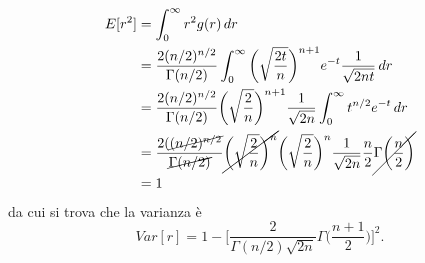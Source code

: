 \documentclass{article}
\theoremstyle{remark}
\begin{document}
\begin{equation}
    \begin{split}
        E[r^2] &= \int_0^\infty r^2g(r)\,dr \\
        &= \frac{2(n/2)^{n/2}}{\Gamma(n/2)}\int_0^\infty \bigg(\sqrt{\frac{2t}{n}}\bigg)^{n + 1}e^{-t}\frac{1}{\sqrt{2nt}}\,dr \\
        &= \frac{2(n/2)^{n/2}}{\Gamma(n/2)}\bigg(\sqrt{\frac{2}{n}}\bigg)^{n + 1}\frac{1}{\sqrt{2n}}\int_0^\infty t^{n/2}e^{-t}\,dr \\
        &= \frac{2(\cancel{(n/2)^{n/2}}}{\cancel{\Gamma(n/2)}}\cancel{\bigg(\sqrt{\frac{2}{n}}\bigg)^{n}}\bigg(\sqrt{\frac{2}{n}}\bigg)^n\frac{1}{\sqrt{2n}}\frac{n}{2}\cancel{\Gamma\bigg(\frac{n}{2}\bigg)} \\
        &= 1
    \end{split}
\end{equation}
da cui si trova che la varianza è
\begin{equation}
    Var[r] = 1 - \bigg[\frac{2}{\Gamma(n/2)\sqrt{2n}}\Gamma\bigg(\frac{n + 1}{2}\bigg)\bigg]^2.
\end{equation}
\end{document}

